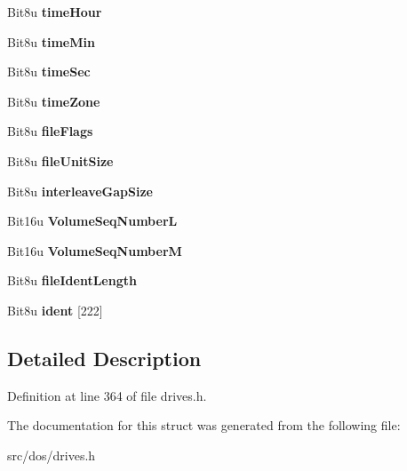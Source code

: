 \begin{DoxyCompactItemize}
\item 
\hypertarget{structisoDirEntry_ad5f7d5ba46e893d19ef699d39a44b875}{Bit8u {\bfseries time\-Hour}}\label{structisoDirEntry_ad5f7d5ba46e893d19ef699d39a44b875}

\item 
\hypertarget{structisoDirEntry_a8babe3c17f3931ffbe6cbba20cfb18b8}{Bit8u {\bfseries time\-Min}}\label{structisoDirEntry_a8babe3c17f3931ffbe6cbba20cfb18b8}

\item 
\hypertarget{structisoDirEntry_aeeda5230d96dd1fc08463136d84f673b}{Bit8u {\bfseries time\-Sec}}\label{structisoDirEntry_aeeda5230d96dd1fc08463136d84f673b}

\item 
\hypertarget{structisoDirEntry_a989029e709520fd23b8dbe878b66e729}{Bit8u {\bfseries time\-Zone}}\label{structisoDirEntry_a989029e709520fd23b8dbe878b66e729}

\item 
\hypertarget{structisoDirEntry_a6c73c88e3eb3329d826091048233e783}{Bit8u {\bfseries file\-Flags}}\label{structisoDirEntry_a6c73c88e3eb3329d826091048233e783}

\item 
\hypertarget{structisoDirEntry_a079492a83780a0316e44bc79b53102e1}{Bit8u {\bfseries file\-Unit\-Size}}\label{structisoDirEntry_a079492a83780a0316e44bc79b53102e1}

\item 
\hypertarget{structisoDirEntry_a6075892ffd1990542c8e68deb4621ddb}{Bit8u {\bfseries interleave\-Gap\-Size}}\label{structisoDirEntry_a6075892ffd1990542c8e68deb4621ddb}

\item 
\hypertarget{structisoDirEntry_ac4632844fa457e6a3efe05744db8e08e}{Bit16u {\bfseries Volume\-Seq\-Number\-L}}\label{structisoDirEntry_ac4632844fa457e6a3efe05744db8e08e}

\item 
\hypertarget{structisoDirEntry_a993c6f1d2836d163140d7c447da856ee}{Bit16u {\bfseries Volume\-Seq\-Number\-M}}\label{structisoDirEntry_a993c6f1d2836d163140d7c447da856ee}

\item 
\hypertarget{structisoDirEntry_a80c4c5121bb984a0d310d897f1cfaecb}{Bit8u {\bfseries file\-Ident\-Length}}\label{structisoDirEntry_a80c4c5121bb984a0d310d897f1cfaecb}

\item 
\hypertarget{structisoDirEntry_adcd0165ef3a6a392c001c2c3d0326b98}{Bit8u {\bfseries ident} \mbox{[}222\mbox{]}}\label{structisoDirEntry_adcd0165ef3a6a392c001c2c3d0326b98}

\end{DoxyCompactItemize}


\subsection{Detailed Description}


Definition at line 364 of file drives.\-h.



The documentation for this struct was generated from the following file\-:\begin{DoxyCompactItemize}
\item 
src/dos/drives.\-h\end{DoxyCompactItemize}
